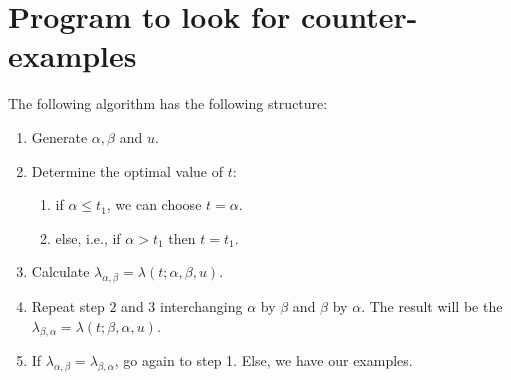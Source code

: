 \newpage
\appendix
\section{Program to look for counter-examples}
\label{appendix:section:algorithm}
The following algorithm has the following structure:
\begin{enumerate}
\item Generate $\alpha, \beta$ and $u$.
\item Determine the optimal value of $t$:
    \begin{enumerate}
    \item if $\alpha \leq t_{1}$, we can choose $t = \alpha$. 
    \item else, i.e., if $\alpha > t_{1}$ then $t = t_{1}$. 
    \end{enumerate} 
\item Calculate $\lambda_{\alpha, \beta} = \lambda(t; \alpha, \beta, u)$. 
\item Repeat step $2$ and $3$ interchanging $\alpha$ by $\beta$ and $\beta$ by $\alpha$. The result will be the $\lambda_{\beta, \alpha} = \lambda(t; \beta, \alpha, u)$. 
\item If $\lambda_{\alpha,\beta} = \lambda_{\beta, \alpha} $, go again to step 1. Else, we have our examples. 
\end{enumerate}
